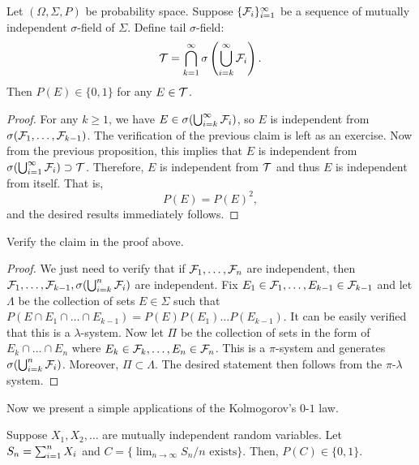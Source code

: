 \documentclass[a4paper]{article}
\begin{document}
\begin{thm}
  Let $(\Omega, \Sigma, P)$ be probability space. 
  Suppose $\{ \mathcal{F}_i \}_{i=1}^\infty$ be a sequence of mutually independent
  $\sigma$-field of $\Sigma$. 
  Define tail $\sigma$-field:
  \[
  \mathcal{T} = \bigcap_{k=1}^\infty \sigma \left( \bigcup_{i=k}^\infty \mathcal{F}_i \right).
  \]
  Then $P(E) \in \{0, 1\}$ for any $E \in \mathcal{T}$.
\end{thm}

\begin{proof}
  For any $k \geq 1$, we have $E \in \sigma (\bigcup_{i=k}^\infty \mathcal{F}_i)$,
  so $E$ is independent from $\sigma (\mathcal{F}_1, \dots, \mathcal{F}_{k - 1})$.
  The verification of the previous claim is left as an exercise.
  Now from the previous proposition,
  this implies that $E$ is independent from $\sigma (\bigcup_{i=1}^\infty \mathcal{F}_i) 
  \supset \mathcal{T}$. Therefore, $E$ is independent from $\mathcal{T}$ 
  and thus $E$ is independent from itself. That is, 
  \[
  P(E) = P(E)^2,
  \]
  and the desired results immediately follows.

\end{proof}

\begin{ex}
  Verify the claim in the proof above.
\end{ex}

\begin{proof}
  We just need to verify that if $\mathcal{F}_1, \dots, \mathcal{F}_n$ are 
  independent, then $\mathcal{F}_1, \dots, \mathcal{F}_{k - 1}, 
  \sigma (\bigcup_{i = k}^n \mathcal{F}_i)$ are independent.
  Fix $E_1 \in \mathcal{F}_1, \dots, E_{k - 1} \in \mathcal{F}_{k - 1}$ 
  and let $\Lambda$ be the collection of sets $E \in \Sigma$ such
  that $P (E \cap E_1 \cap \dots \cap E_{k - 1}) 
  = P(E) P (E_1) \dots P(E_{k - 1})$. 
  It can be easily verified that this is a $\lambda$-system. 
  Now let $\Pi$ be the collection of sets in the form 
  of $E_k \cap \dots \cap E_n$ where 
  $E_k \in \mathcal{F}_k, \dots, E_n \in \mathcal{F}_n$. 
  This is a $\pi$-system and generates $\sigma (\bigcup_{i=k}^n 
  \mathcal{F}_i)$. Moreover, $\Pi \subset \Lambda$. 
  The desired statement then follows from the $\pi$-$\lambda$ system.

\end{proof}

Now we present a simple applications of the Kolmogorov's $0$-$1$ law.

\begin{prop}
  Suppose $X_1, X_2, \dots$ are mutually independent random 
  variables. Let $S_n = \sum_{i=1}^n X_i$ and 
  $C = \{ \lim_{n \to \infty} S_n / n \text{ exists} \}$. 
  Then, $P (C) \in \{ 0, 1 \}$.
\end{prop}
\end{document}
